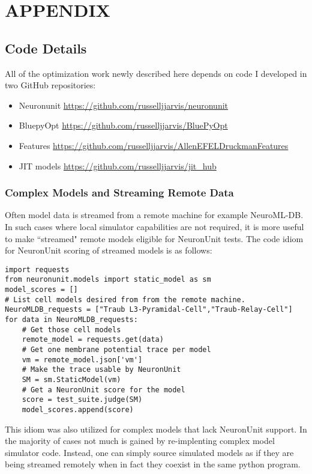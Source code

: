 \chapter{APPENDIX}
\label{sec:appendix}
\section{Code Details}
All of the optimization work newly described here depends on code I developed in two GitHub repositories:
\begin{itemize}
\item Neuronunit \url{https://github.com/russelljjarvis/neuronunit}
\item BluepyOpt \url{https://github.com/russelljjarvis/BluePyOpt}
\item Features \url{https://github.com/russelljjarvis/AllenEFELDruckmanFeatures}
\item JIT models \url{https://github.com/russelljjarvis/jit_hub}
\end{itemize}

\subsection{Complex Models and Streaming Remote Data}
\label{sec:streaming}
Often model data is streamed from a remote machine for example NeuroML-DB.
In such cases where local simulator capabilities are not required, it is more useful to make ``streamed" remote models eligible for NeuronUnit tests.
The code idiom for NeuronUnit scoring of streamed models is as follows:

\begin{verbatim}
import requests
from neuronunit.models import static_model as sm
model_scores = []
# List cell models desired from from the remote machine.
NeuroMLDB_requests = ["Traub L3-Pyramidal-Cell","Traub-Relay-Cell"]
for data in NeuroMLDB_requests:
    # Get those cell models    
    remote_model = requests.get(data)
    # Get one membrane potential trace per model
    vm = remote_model.json['vm']
    # Make the trace usable by NeuronUnit
    SM = sm.StaticModel(vm)
    # Get a NeuronUnit score for the model
    score = test_suite.judge(SM)
    model_scores.append(score)
\end{verbatim}
\label{code:idiom2}

This idiom was also utilized for complex models that lack NeuronUnit support.
In the majority of cases not much is gained by re-implenting complex model simulator code.
Instead, one can simply source simulated models as if they are being streamed remotely when in fact they coexist in the same python program.


